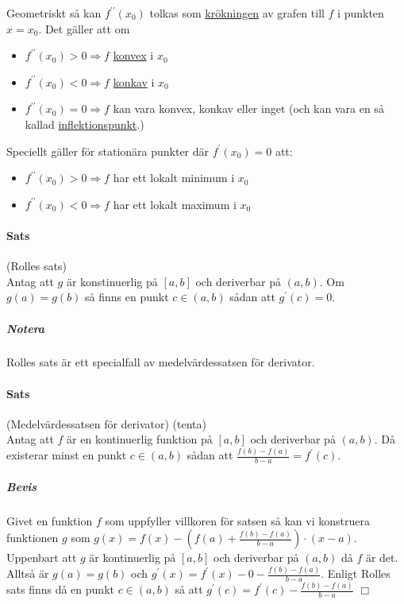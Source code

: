 Geometriskt så kan $f^{\prime\prime}(x_0)$ tolkas som \underline{krökningen} av grafen till $f$ i punkten $x=x_0$.
Det gäller att om
\begin{itemize}
    \item $f^{\prime\prime}(x_0)>0\Rightarrow f$ \underline{konvex} i $x_0$
    \item $f^{\prime\prime}(x_0)<0\Rightarrow f$ \underline{konkav} i $x_0$
    \item $f^{\prime\prime}(x_0)=0\Rightarrow f$ kan vara konvex, konkav eller inget (och kan vara en så kallad \underline{inflektionspunkt}.)
\end{itemize}

Speciellt gäller för stationära punkter där $f^\prime(x_0)=0$ att:
\begin{itemize}
    \item $f^{\prime\prime}(x_0)>0\Rightarrow f$ har ett lokalt minimum i $x_0$
    \item $f^{\prime\prime}(x_0)<0\Rightarrow f$ har ett lokalt maximum i $x_0$
\end{itemize}

\paragraph{Sats} (Rolles sats)\\
Antag att $g$ är konstinuerlig på $[a,b]$ och deriverbar på $(a,b)$.
Om $g(a)=g(b)$ så finns en punkt $c\in(a,b)$ sådan att $g^\prime(c)=0$.
\subparagraph{Notera} Rolles sats är ett specialfall av medelvärdessatsen för derivator.

\paragraph{Sats} (Medelvärdessatsen för derivator) (tenta)\\
Antag att $f$ är en kontinuerlig funktion på $[a,b]$ och deriverbar på $(a,b)$.
Då existerar minst en punkt $c\in(a,b)$ sådan att $\frac{f(b)-f(a)}{b-a}=f^\prime(c)$.\\
\subparagraph{Bevis}
Givet en funktion $f$ som uppfyller villkoren för satsen så kan vi konstruera funktionen $g$ som $g(x)=f(x)-(f(a)+\frac{f(b)-f(a)}{b-a})\cdot (x-a)$.
Uppenbart att $g$ är kontinuerlig på $[a,b]$ och deriverbar på $(a,b)$ då $f$ är det.
Alltså är $g(a)=g(b)$ och $g^\prime(x)=f^\prime(x)-0-\frac{f(b)-f(a)}{b-a}$.
Enligt Rolles sats finns då en punkt $c\in(a,b)$ så att $g^\prime(c)=f^\prime(c)-\frac{f(b)-f(a)}{b-a}$ $\Box$

